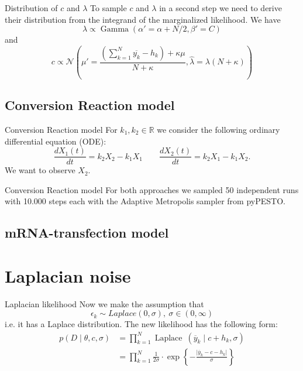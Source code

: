 \documentclass{beamer}
\newcommand{\R}{\mathbb{R}}
\begin{document}
   	\begin{frame}{Distribution of $c$ and $\lambda$}
   		To sample $c$ and $\lambda$ in a second step we need to derive their 
   		distribution from the integrand of the marginalized likelihood. We have
   		\[
   			\lambda \propto \operatorname{Gamma}(\alpha' = \alpha + N/2, \beta' 
   			= C)
   		\]
		and
		\[
			c \propto \mathcal{N} \left(\mu' = \frac{\left(\sum_{k = 1}^N
			\overline{y_k}-h_k \right) + \kappa \mu }{N + \kappa}, \hat{\lambda}
			= \lambda (N + \kappa) \right)
		\]
   	\end{frame}
	
	\subsection{Conversion Reaction model}	
	
	\begin{frame}{Conversion Reaction model}
		For $k_1, k_2 \in \R$ we consider the following ordinary differential
		equation (ODE):
		\[
			\frac{d X_1(t)}{dt} = k_2 X_2 - k_1 X_1 \quad \quad 
			\frac{d X_2(t)}{dt} = k_2 X_1 - k_1 X_2.
		\]
		We want to observe $X_2$.
	\end{frame}
	
	\begin{frame}{Conversion Reaction model}
		For both approaches we sampled 50 independent runs with 10.000 steps each 
		with the Adaptive Metropolis sampler from pyPESTO.
	\end{frame}
	
	\subsection{mRNA-transfection model}




\section{Laplacian noise}

	\begin{frame}{Laplacian likelihood}
		Now we make the assumption that 
		\[
			\epsilon_k \sim Laplace(0, \sigma), \ \sigma \in (0, \infty)
		\]
		i.e. it has a Laplace distribution. The new likelihood has the following 
		form:
		\begin{align*}
    		p(D \mid \theta, c, \sigma) &= \prod_{k = 1}^N \operatorname{Laplace}
    		\ (\overline{y}_k	\mid c + h_k, \sigma) \\
    		&= \prod_{k = 1}^N \frac{1}{2\sigma} \cdot \exp \left\{- 							\frac{\lvert \overline{y}_k - c- h_k \lvert}{\sigma} \right\}
		\end{align*}
	\end{frame}
	
\end{document}
